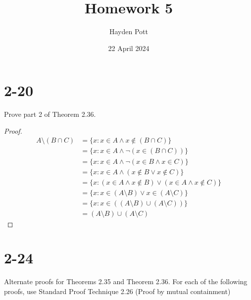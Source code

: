 \documentclass{article}
\begin{document}
\title{Homework 5}
\author{Hayden Pott}
\date{22 April 2024}

\maketitle

\section{2-20}

Prove part 2 of Theorem 2.36.

\begin{proof}
    \begin{align*}
        A \setminus (B \cap C) &= \{x : x \in A \land x \not\in (B \cap C) \} \\
        &= \{x : x \in A \land \neg(x \in (B \cap C)) \} \\
        &= \{x : x \in A \land \neg(x \in B \land x \in C) \} \\
        &= \{x : x \in A \land (x \not\in B \lor x \not\in C) \} \\
        &= \{x : (x \in A \land x \not\in B) \lor (x \in A \land x \not\in C) \} \\
        &= \{x : x \in (A \setminus B) \lor x \in (A \setminus C) \} \\
        &= \{x : x \in ((A \setminus B) \cup (A \setminus C)) \} \\
        &= (A \setminus B) \cup (A \setminus C)
    \end{align*}

\end{proof}

\section{2-24}

Alternate proofs for Theorems 2.35 and Theorem 2.36.  For each of the following
proofs, use Standard Proof Technique 2.26 (Proof by mutual containment)
\end{document}
